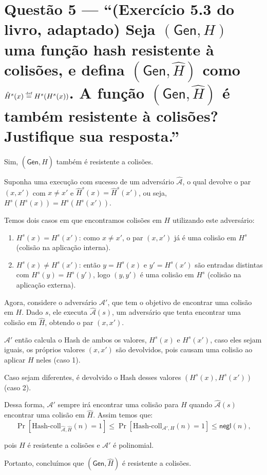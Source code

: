 \documentclass[11pt,a4paper]{article}
\newcommand{\Gen}{\mathsf{Gen}}
\newcommand{\negl}{\mathsf{negl}}
\newcommand{\defeq}{\stackrel{\text{\tiny def}}{=}}
\begin{document}
    \clearpage

    \section*{Questão 5 --- ``(Exercício 5.3 do livro, adaptado) Seja $(\Gen, H)$ uma
    função hash resistente à colisões, e defina $(\Gen, \hat{H})$ como
        $\hat{H}^{s}(x) \defeq H^{s}(H^{s}(x))$. A função $(\Gen, \hat{H})$ é também
        resistente à colisões? Justifique sua resposta.''}

    Sim, $(\Gen, \hat H)$ também é resistente a colisões.

    Suponha uma execução com sucesso de um adversário $\hat{\mathcal{A}}$, o qual devolve o par $(x, x')$ com $x \neq x'$ e $\hat H^s(x) = \hat H^s(x')$,
    ou seja, $H^s(H^s(x)) = H^s(H^s(x'))$.

    Temos dois casos em que encontramos colisões em $H$ utilizando este adversário:

    \begin{enumerate}
        \item $H^{s}(x) = H^{s}(x')$: como $x \neq x'$, o par $(x, x')$ já é uma
        colisão em $H^{s}$ (colisão na aplicação interna).

        \item $H^{s}(x) \neq H^{s}(x')$: então $y = H^{s}(x)$ e $y' = H^{s}(x')$ são
        entradas distintas com $H^{s}(y) = H^{s}(y')$, logo $(y, y')$ é uma colisão
        em $H^{s}$ (colisão na aplicação externa).
    \end{enumerate}


    Agora, considere o adversário $\mathcal{A}'$, que tem o objetivo de encontrar uma colisão em $H$.
    Dado $s$, ele executa $\hat{\mathcal{A}}(s)$, um adversário que tenta encontrar uma colisão em $\hat H$, obtendo o par $(x, x')$.

    $\mathcal{A}'$ então calcula o Hash de ambos os valores, $H^{s}(x)$ e $H^{s}(x')$, caso eles sejam iguais, os próprios valores $(x, x')$ são
    devolvidos, pois causam uma colisão ao aplicar $H$ neles (caso 1).

    Caso sejam diferentes, é devolvido o Hash desses valores $(H^{s}(x), H^{s}(x'))$ (caso 2).

    Dessa forma, $\mathcal{A}'$ sempre irá encontrar uma colisão para $H$ quando $\hat{\mathcal{A}}(s)$ encontrar uma colisão em $\hat H$.
    Assim temos que:
    \[
        \Pr\left[\text{Hash-coll}_{\hat{\mathcal{A}}, \hat H}(n) = 1\right]
        \le \Pr\left[\text{Hash-coll}_{\mathcal{A}', H}(n) = 1\right]
        \le \negl(n),
    \]

    pois $H$ é resistente a colisões e $\mathcal{A}'$ é polinomial.

    Portanto, concluímos que $(\Gen, \hat H)$ é resistente a colisões.
\end{document}
